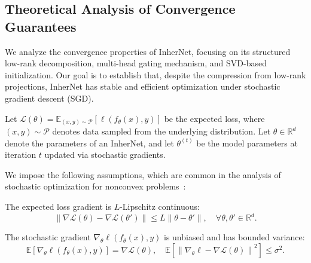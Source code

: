 \documentclass{article} %
\begin{document}







\subsection{Theoretical Analysis of Convergence Guarantees}
\label{sec:convergence}

We analyze the convergence properties of InherNet, focusing on its structured low-rank decomposition, multi-head gating mechanism, and SVD-based initialization. Our goal is to establish that, despite the compression from low-rank projections, InherNet has stable and efficient optimization under stochastic gradient descent (SGD).

Let $\mathcal{L}(\theta) = \mathbb{E}_{(x,y)\sim \mathcal{P}}[\ell(f_\theta(x), y)]$ be the expected loss, where $(x, y) \sim \mathcal{P}$ denotes data sampled from the underlying distribution. Let $\theta \in \mathbb{R}^d$ denote the parameters of an InherNet, and let $\theta^{(t)}$ be the model parameters at iteration $t$ updated via stochastic gradients.

We impose the following assumptions, which are common in the analysis of stochastic optimization for nonconvex problems~\citep{patel2022global, xu2024psmgd, lei2019stochastic, pham2020proxsarah}:

\begin{assumption}
\label{assumption:lipschitz}
The expected loss gradient is $L$-Lipschitz continuous:
\begin{equation}
    \|\nabla \mathcal{L}(\theta) - \nabla \mathcal{L}(\theta')\| \leq L\|\theta - \theta'\|, \quad \forall \theta, \theta' \in \mathbb{R}^d.
\end{equation}
\end{assumption}

\begin{assumption}
\label{assumption:variance}
The stochastic gradient $\nabla_\theta \ell(f_\theta(x), y)$ is unbiased and has bounded variance:
\begin{equation}
    \mathbb{E}[\nabla_\theta \ell(f_\theta(x), y)] = \nabla \mathcal{L}(\theta), \quad
\mathbb{E}\left[\left\|\nabla_\theta \ell - \nabla \mathcal{L}(\theta)\right\|^2\right] \leq \sigma^2.
\end{equation}
\end{assumption}
\end{document}
